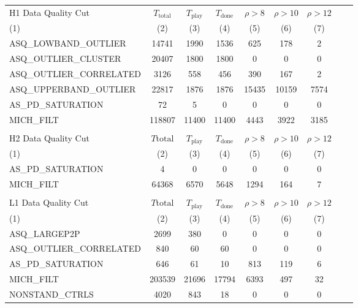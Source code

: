 \begin{table}[p]
\begin{center}
\begin{tabular}{lcccccccc}
H1 Data Quality Cut      &$T_\mathrm{total}$&$T_\mathrm{play}$&$T_\mathrm{done}$&$\rho>8$&$\rho>10$&$\rho>12$ \\
(1)                      &(2)     &(3)    &(4)    &(5)     &(6)     &(7)\\\hline
ASQ\_LOWBAND\_OUTLIER    &  14741 &  1990 &  1536 &   625  &  178   &   2 \\
ASQ\_OUTLIER\_CLUSTER    &  20407 &  1800 &  1800 &     0  &    0   &   0 \\
ASQ\_OUTLIER\_CORRELATED &   3126 &   558 &   456 &   390  &  167   &   2 \\
ASQ\_UPPERBAND\_OUTLIER  &  22817 &  1876 &  1876 & 15435  &10159   &7574 \\
AS\_PD\_SATURATION       &     72 &     5 &     0 &     0  &    0   &   0 \\
MICH\_FILT               & 118807 & 11400 & 11400 &  4443  & 3922   &3185 \\
\hline\hline
\\
H2 Data Quality Cut      &$T\mathrm{total}$&$T_\mathrm{play}$&$T_\mathrm{done}$&$\rho>8$&$\rho>10$&$\rho>12$ \\
(1)                      &(2)     &(3)    &(4)    &(5)     &(6)     &(7)  \\\hline
AS\_PD\_SATURATION        &    4   &   0   &   0  &    0  &    0   &   0 \\
MICH\_FILT                &64368   &6570   &5648  & 1294  &  164   &   7 \\
\hline\hline
\\
L1 Data Quality Cut      &$T\mathrm{total}$&$T_\mathrm{play}$&$T_\mathrm{done}$&$\rho>8$&$\rho>10$&$\rho>12$ \\
(1)                      &(2)     &(3)    &(4)    &(5)     &(6)     &(7)  \\\hline
ASQ\_LARGEP2P            &   2699 &   380 &     0  &    0 &    0  &    0 \\
ASQ\_OUTLIER\_CORRELATED &    840 &    60 &    60  &    0 &    0  &    0 \\
AS\_PD\_SATURATION       &    646 &    61 &    10  &  813 &  119  &    6 \\
MICH\_FILT               & 203539 & 21696 & 17794  & 6393 &  497  &   32 \\
NONSTAND\_CTRLS          &   4020 &   843 &    18  &    0 &    0  &    0 \\

\end{tabular}
\end{center}
\end{table}
